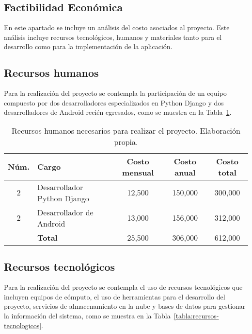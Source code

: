 \subsection{Factibilidad Económica}
En este apartado se incluye un análisis del costo asociados al proyecto. Este análisis incluye recursos tecnológicos, humanos y materiales tanto para el desarrollo como para la implementación de la aplicación. 

\subsection*{Recursos humanos}
Para la realización del proyecto se contempla la participación de un equipo compuesto por dos desarrolladores especializados en Python Django y dos desarrolladores de Android recién egresados, como se muestra en la Tabla~\ref{tabla:recursos-humanos}.

\begin{table}[h!]
	\centering
	\begin{tabular}{|c|l|c|c|c|}
		\hline
		\textbf{Núm.} & \textbf{Cargo}                      & \textbf{Costo mensual} & \textbf{Costo anual} & \textbf{Costo total} \\ \hline
		2             & Desarrollador Python Django         & 12,500                 & 150,000              & 300,000              \\ \hline
		2             & Desarrollador de Android            & 13,000                 & 156,000              & 312,000              \\ \hline
		& \textbf{Total}                     & 25,500                 & 306,000              & 612,000              \\ \hline
	\end{tabular}
	\caption{Recursos humanos necesarios para realizar el proyecto. Elaboración propia.}
	\label{tabla:recursos-humanos}
\end{table}


\subsection*{Recursos tecnológicos}
Para la realización del proyecto se contempla el uso de recursos tecnológicos que incluyen equipos de cómputo, el uso de herramientas para el desarrollo del proyecto, servicios de almacenamiento en la nube y bases de datos para gestionar la información del sistema, como se muestra en la Tabla~\ref{tabla:recursos-tecnologicos}. 

